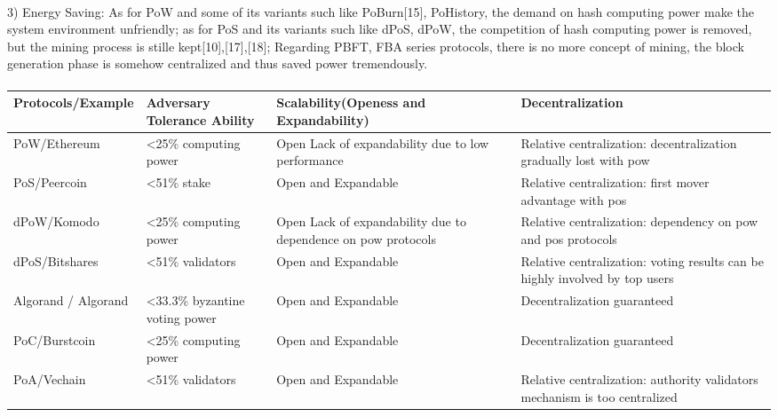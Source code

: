 \documentclass[]{article}
\begin{document}
\begin{CJK*}{UTF8}{gbsn}
\paragraph{}
3)  Energy Saving: As for PoW and some of its variants such like PoBurn[15], PoHistory, the demand on hash computing power make the system environment unfriendly; as for PoS and its variants such like dPoS, dPoW, the competition of hash computing power is removed, but the mining process is stille kept[10],[17],[18];
Regarding PBFT, FBA series protocols, there is no more concept of mining, the block generation phase is somehow centralized and thus saved power tremendously.
\paragraph{}
\begin{tabular}{p{2cm}p{3cm}p{3cm}p{3cm}}
\hline
Protocols/E\-xample  & 
Adversary Tolerance Ability & 
Scalability(Openess and Expandability) & Decentralization \\ \hline

PoW/Ethe\-reum  & \textless25\% computing power & Open \newline Lack of expandability due to low performance & Relative centralization:  decentralization gradually lost with pow\\ \hline

PoS/Peercoin & 
\textless51\% stake & 
Open and Expandable & 
Relative centralization: first mover advantage with pos\\ \hline

dPoW/Komo\-do  & 
\textless25\% computing power &
  Open  \newline Lack of expandability due to dependence on pow protocols & 
  Relative centralization: dependency on pow and pos protocols \\ \hline
dPoS/\newline Bitshares  & \textless51\% validators & Open and Expandable & Relative centralization: voting results can be highly involved by top users \\ \hline
Algorand / Algorand & \textless33.3\% byzantine voting power & Open and Expandable & Decentralization guaranteed  \\ \hline
PoC/Burst\-coin &
 \textless25\% computing power &
  Open and Expandable &
  Decentralization guaranteed \\ \hline
  
  PoA/Vechain &
 \textless51\% validators &
  Open and Expandable &
  Relative centralization: authority validators mechanism is too centralized\\ \hline
  \end{tabular}

\end{CJK*}
\end{document}
